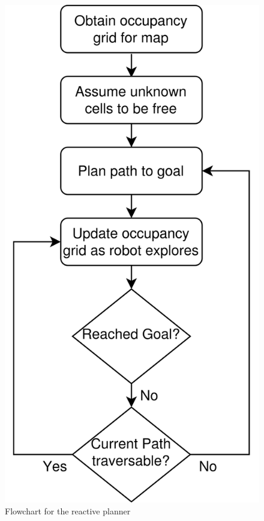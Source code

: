 \documentclass[a4paper,12pt]{article}
\begin{document}
			\begin{figure}[H]
				\centering
				\includegraphics[scale=0.15]{images/reactivePlannerFlowchart.png}
				\caption{Flowchart for the reactive planner}
				\label{reactivePlannerFlowchart}
			\end{figure}
\end{document}
